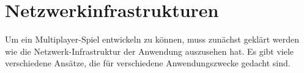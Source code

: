 



\section{Netzwerkinfrastrukturen}
Um ein Multiplayer-Spiel entwickeln zu können, muss zunächst geklärt werden wie die Netzwerk-Infrastruktur der Anwendung auszusehen hat. Es gibt viele verschiedene Ansätze, die für verschiedene Anwendungszwecke gedacht sind.

